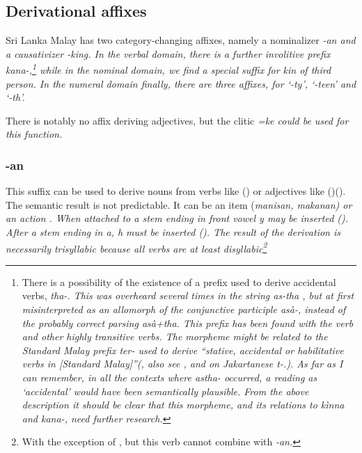 \subsection{Derivational affixes}\label{sec:morph:Derivationalaffixes}
Sri Lanka Malay has two category-changing affixes, namely a nominalizer \em -an \em and a causativizer \em -king\em. In the verbal domain, there is a further involitive prefix \em kana-\em,\footnote{There is a possibility of the existence of a prefix used to derive accidental verbs, \em tha-\em. This was overheard several times in the string \em as-tha \em, but at first misinterpreted as an allomorph of the conjunctive participle \em asà-\em, instead of the probably correct parsing \em asà+tha\em. This prefix has been found with the verb  and other highly transitive verbs. The morpheme might be related to the Standard Malay prefix \em ter- \em used to derive ``stative, accidental or habilitative verbs in [Standard Malay]''(\citet{Paauw2004}, also see \citet{Adelaar2005struct}, and \citet[181]{Adelaar1985} on Jakartanese \em t\E-\em.). As far as I can remember, in all the contexts where \em astha- \em occurred, a reading as `accidental' would have been semantically plausible. From the above description it should be clear that this morpheme, and its relations to \em kìnna \em {} and \em kana-, \em {} need further research.} while in the nominal domain, we find a special suffix for kin of third person. In the numeral domain finally, there are three affixes, for `-ty', `-teen' and `-th'.

There is notably no affix deriving adjectives, but the clitic \em =ke \em {} could be used for this function.

\subsubsection{-an}\label{sec:morph:-an}
This suffix can be used to derive nouns from verbs like  () or adjectives like  ()(\citet[cf.][28]{Adelaar1991}). The semantic result is not predictable. It can be an item (\em manisan, makanan\em) or an action . When attached to a stem ending in front  vowel \em y \em may be inserted (). After a stem ending in \em a\em, \em h \em must be inserted (). The result of the derivation is necessarily trisyllabic because all verbs are at least disyllabic\footnote{With the exception of , but this verb cannot combine with \em -an\em.}
 
